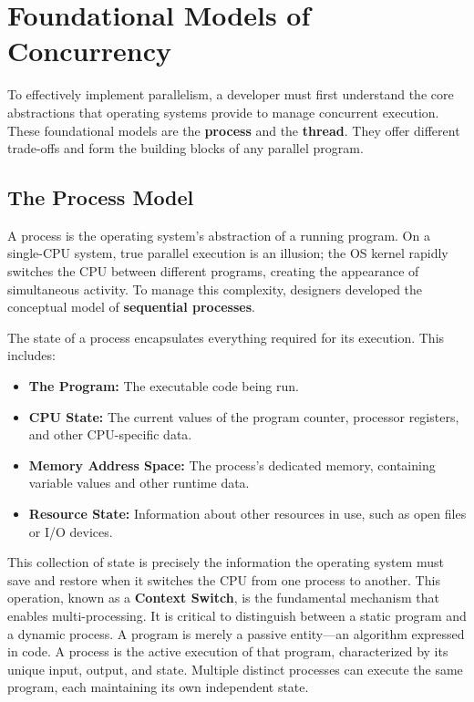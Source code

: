 \documentclass{article} %
\begin{document}
\section{Foundational Models of Concurrency}
To effectively implement parallelism, a developer must first understand the core abstractions that operating systems provide to manage concurrent execution. These foundational models are the \textbf{process} and the \textbf{thread}. They offer different trade-offs and form the building blocks of any parallel program.

\subsection{The Process Model}
A process is the operating system's abstraction of a running program. On a single-CPU system, true parallel execution is an illusion; the OS kernel rapidly switches the CPU between different programs, creating the appearance of simultaneous activity. To manage this complexity, designers developed the conceptual model of \textbf{sequential processes}.

The state of a process encapsulates everything required for its execution. This includes:
\begin{itemize}
    \item \textbf{The Program:} The executable code being run.
    \item \textbf{CPU State:} The current values of the program counter, processor registers, and other CPU-specific data.
    \item \textbf{Memory Address Space:} The process's dedicated memory, containing variable values and other runtime data.
    \item \textbf{Resource State:} Information about other resources in use, such as open files or I/O devices.
\end{itemize}
This collection of state is precisely the information the operating system must save and restore when it switches the CPU from one process to another. This operation, known as a \textbf{Context Switch}, is the fundamental mechanism that enables multi-processing.
It is critical to distinguish between a static program and a dynamic process. A program is merely a passive entity---an algorithm expressed in code. A process is the active execution of that program, characterized by its unique input, output, and state. Multiple distinct processes can execute the same program, each maintaining its own independent state.
\end{document}
